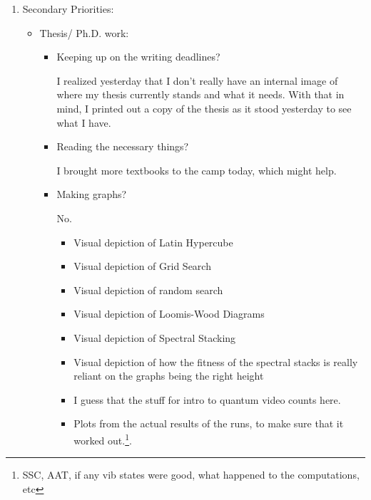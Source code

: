 \documentclass[12pt]{article}
\renewcommand{\,}{\textsuperscript{,}}
\begin{document}
\begin{enumerate}
\begin{itemize}
\end{itemize}

\item Secondary Priorities:

\begin{itemize}

\item Thesis/ Ph.D. work:

\begin{itemize}

\item Keeping up on the writing deadlines?

I realized yesterday that I don't really have an internal image of where my thesis currently stands and what it needs.  
With that in mind, I printed out a copy of the thesis as it stood yesterday to see what I have.

\item Reading the necessary things?

I brought more textbooks to the camp today, which might help.

\item Making graphs?

No.

\begin{itemize}

\item Visual depiction of Latin Hypercube

\item Visual depiction of Grid Search

\item Visual depiction of random search

\item Visual depiction of Loomis-Wood Diagrams

\item Visual depiction of Spectral Stacking

\item Visual depiction of how the fitness of the spectral stacks is really reliant on the graphs being the right height

\item I guess that the stuff for intro to quantum video counts here.

\item Plots from the actual results of the runs, to make sure that it worked out.\footnote{SSC, AAT, if any vib states were good, what happened to the computations, etc}.

\end{itemize}


\end{itemize}
\end{itemize}
\end{enumerate}
\end{document}
